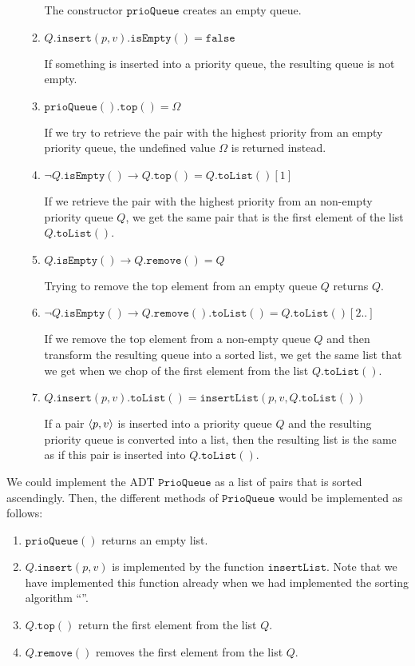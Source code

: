 \begin{Definition}
\begin{enumerate}
\begin{enumerate}
            The constructor $\mathtt{prioQueue}$ creates an empty queue.
      \item $Q.\mathtt{insert}(p, v).\mathtt{isEmpty}() = \mathtt{false}$

            If something is inserted into a priority queue, the resulting queue is not empty.
      \item $\mathtt{prioQueue}().\mathtt{top}() = \Omega$

            If we try to retrieve the pair with the highest priority from an empty priority queue, the
            undefined value $\Omega$ is returned instead.
      \item $\neg Q.\mathtt{isEmpty}() \rightarrow Q.\mathtt{top}() = Q.\mathtt{toList}()[1]$

            If we retrieve the  pair with the highest priority from an non-empty priority queue $Q$,
            we get the same pair that is the first element of the list $Q.\mathtt{toList}()$.

      \item $Q.\mathtt{isEmpty}() \rightarrow Q.\mathtt{remove}() = Q$

            Trying to remove the top element from an empty queue $Q$ returns $Q$.
      \item $\neg Q.\mathtt{isEmpty}() \rightarrow Q.\mathtt{remove}().\mathtt{toList}() =
        Q.\mathtt{toList}()[2..]$

            If we remove the top element from a non-empty queue $Q$ and then transform the resulting queue into
            a sorted list, we get the same list that we get when we chop of the first element from the list
            $Q.\mathtt{toList}()$.
      \item $Q.\mathtt{insert}(p,v).\mathtt{toList}() = \mathtt{insertList}(p,v,Q.\mathtt{toList}())$

            If a pair $\pair(p,v)$ is inserted into a priority queue $Q$ and the resulting priority queue is
            converted into a list, then the resulting list is the same as if this pair is inserted
            into $Q.\mathtt{toList}()$.
      \end{enumerate}
\end{enumerate}
\end{Definition}
We could implement the ADT $\mathtt{PrioQueue}$ as a list of pairs that is sorted ascendingly.
Then, the different methods of $\mathtt{PrioQueue}$ would be implemented as follows:
\begin{enumerate}
\item $\mathtt{prioQueue}()$ returns an empty list.
\item $Q.\mathtt{insert}(p,v)$ is implemented by the function $\mathtt{insertList}$.  Note that we have
      implemented this function already when we had implemented the sorting algorithm ``''.
\item $Q.\mathtt{top}()$ return the first element from the list $Q$.
\item $Q.\mathtt{remove}()$ removes the first element from the list $Q$.
\end{enumerate}
